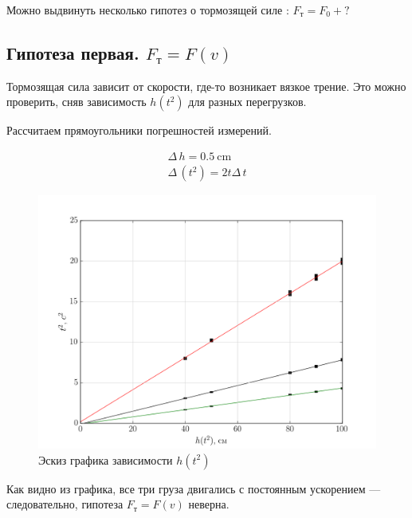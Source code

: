 Можно выдвинуть несколько гипотез о тормозящей силе : $F_\text{т}=F_0+?$

\subsection{Гипотеза первая. $F_\text{т}=F(v)$}
Тормозящая сила зависит от скорости, где-то возникает вязкое трение. Это можно проверить, сняв зависимость $h(t^2)$ для разных перегрузков. 

Рассчитаем прямоугольники погрешностей измерений.

\begin{gather*}
	\Delta\,h=0.5\ \text{cm}\\
	\Delta\,(t^2)=2t\Delta\,t
\end{gather*}


\begin{figure}[h]
\begin{center}
\includegraphics*[width=1\textwidth]{img/ex1.png}
\caption{\label{fig1}Эскиз графика зависимости $h(t^2)$}
\end{center}
\end{figure}

Как видно из графика, все три груза двигались с постоянным ускорением --- следовательно, гипотеза $F_\text{т}=F(v)$ неверна. 


